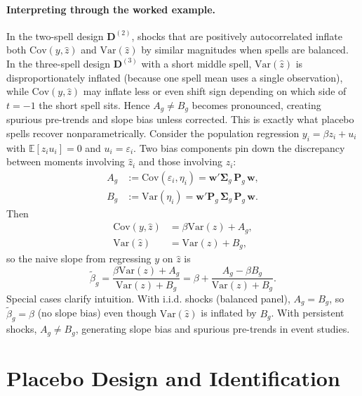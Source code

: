 \documentclass[11pt,a4paper]{article}
\newcommand{\Var}{\text{Var}}
\newcommand{\Cov}{\text{Cov}}
\begin{document}
\paragraph{Interpreting through the worked example.} In the two-spell design $\mathbf D^{(2)}$, shocks that are positively autocorrelated inflate both $\Cov(y,\hat z)$ and $\Var(\hat z)$ by similar magnitudes when spells are balanced. In the three-spell design $\mathbf D^{(3)}$ with a short middle spell, $\Var(\hat z)$ is disproportionately inflated (because one spell mean uses a single observation), while $\Cov(y,\hat z)$ may inflate less or even shift sign depending on which side of $t=-1$ the short spell sits. Hence $A_g\neq B_g$ becomes pronounced, creating spurious pre-trends and slope bias unless corrected. This is exactly what placebo spells recover nonparametrically.
Consider the population regression $y_i=\beta z_i+u_i$ with $\mathbb E[z_i u_i]=0$ and $u_i=\varepsilon_i$. Two bias components pin down the discrepancy between moments involving $\hat z_i$ and those involving $z_i$:
\begin{align}
A_g &:= \Cov(\varepsilon_i,\eta_i) = \mathbf w'\boldsymbol\Sigma_g\,\mathbf P_g\,\mathbf w,\\
B_g &:= \Var(\eta_i) = \mathbf w'\mathbf P_g\,\boldsymbol\Sigma_g\,\mathbf P_g\,\mathbf w.
\end{align}
Then
\begin{align}
\Cov(y,\hat z) &= \beta\Var(z) + A_g,\\
\Var(\hat z) &= \Var(z) + B_g,
\end{align}
so the naive slope from regressing $y$ on $\hat z$ is
\begin{equation}
\tilde\beta_g = \frac{\beta\Var(z)+A_g}{\Var(z)+B_g} = \beta + \frac{A_g-\beta B_g}{\Var(z)+B_g}.
\end{equation}
Special cases clarify intuition. With i.i.d. shocks (balanced panel), $A_g=B_g$, so $\tilde\beta_g=\beta$ (no slope bias) even though $\Var(\hat z)$ is inflated by $B_g$. With persistent shocks, $A_g\neq B_g$, generating slope bias and spurious pre-trends in event studies.

\section{Placebo Design and Identification}
\end{document}
